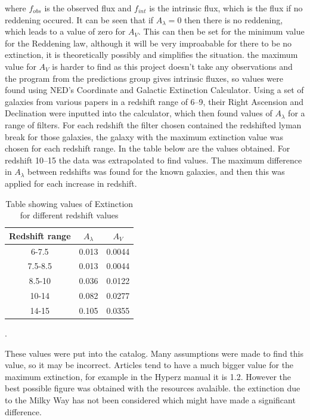 			where $f_{obs}$ is the observed flux and $f_{int}$ is the intrinsic flux, which is the flux if no reddening occured\cite{hyperz}. It can be seen that if $A_\lambda=0$ then there is no reddening, which leads to a value of zero for $A_V$. This can then be set for the minimum value for the Reddening law, although it will be very improabable for there to be no extinction, it is theoretically possibly and simplifies the situation. the maximum value for $A_V$ is harder to find as this project doesn't take any observations and the program from the predictions group gives intrinsic fluxes, so values were found using NED's Coordinate and Galactic Extinction Calculator\cite{NEDex}. Using a set of galaxies from various papers in a redshift range of 6--9, their Right Ascension and Declination were inputted into the calculator, which then found values of $A_\lambda$ for a range of filters. For each redshift the filter chosen contained the redshifted lyman break for those galaxies, the galaxy with the maximum extinction value was chosen for each redshift range. In the table below are the values obtained. For redshift 10--15 the data was extrapolated to find values. The maximum difference in $A_\lambda$ between redshifts was found for the known galaxies, and then this was applied for each increase in redshift.
			\begin{table}[ht]
				\begin{center}
					\begin{tabular}{c|c|c}
						Redshift range & $A_\lambda$ & $A_V$  \\
						\hline \hline
						6-7.5	   &0.013&  0.0044 \\
						7.5-8.5&0.013&  0.0044 \\
						8.5-10 &0.036&  0.0122\\
						10-14  &0.082&  0.0277\\
						14-15  &0.105&  0.0355\\
					\end{tabular}
				\end{center}
				\caption{Table showing values of Extinction for different redshift values}
				\label{tab:extinction_values}
			\end{table}.

			These values were put into the catalog. Many assumptions were made to find this value, so it may be incorrect. Articles tend to have a much bigger value for the maximum extinction, for example in the Hyperz manual it is 1.2. However the best possible figure was obtained with the resources avalaible. the extinction due to the Milky Way has not been considered which might have made a significant difference.

